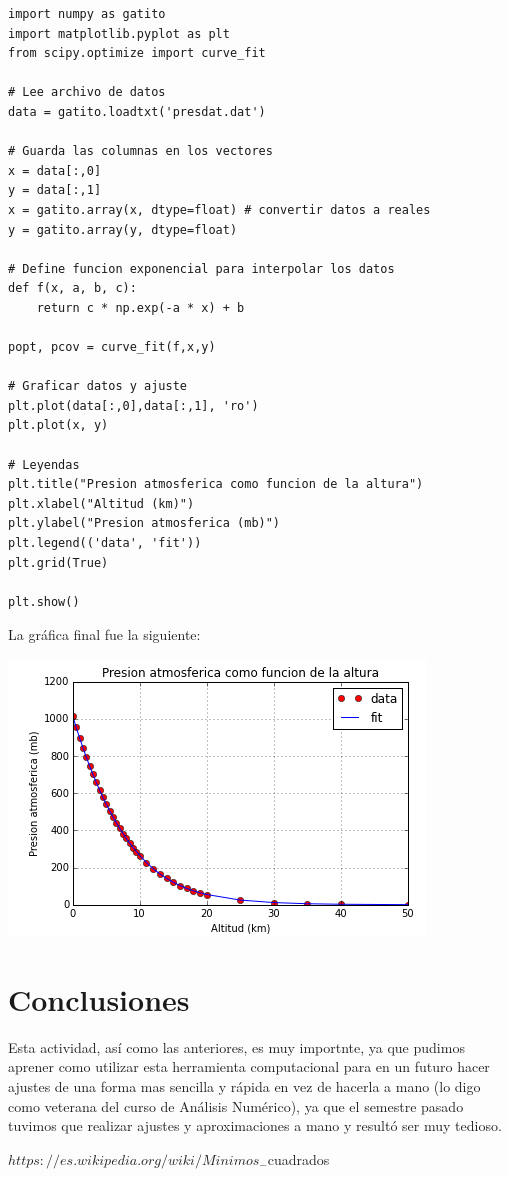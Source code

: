 \documentclass[12pt,letterpaper]{article}
\begin{document}
\begin{verbatim}
import numpy as gatito
import matplotlib.pyplot as plt
from scipy.optimize import curve_fit

# Lee archivo de datos
data = gatito.loadtxt('presdat.dat')

# Guarda las columnas en los vectores
x = data[:,0]
y = data[:,1]
x = gatito.array(x, dtype=float) # convertir datos a reales
y = gatito.array(y, dtype=float) 

# Define funcion exponencial para interpolar los datos
def f(x, a, b, c):
    return c * np.exp(-a * x) + b

popt, pcov = curve_fit(f,x,y)

# Graficar datos y ajuste
plt.plot(data[:,0],data[:,1], 'ro')
plt.plot(x, y)

# Leyendas
plt.title("Presion atmosferica como funcion de la altura")
plt.xlabel("Altitud (km)")
plt.ylabel("Presion atmosferica (mb)")
plt.legend(('data', 'fit'))
plt.grid(True)

plt.show()
\end{verbatim}

La gráfica final fue la siguiente:

\begin{center}
\includegraphics[scale=.7]{act4img1.png}
\end{center}

\section*{Conclusiones}
Esta actividad, así como las anteriores, es muy importnte, ya que pudimos aprener como utilizar esta herramienta computacional para en un futuro hacer ajustes de una forma mas sencilla y rápida en vez de hacerla a mano (lo digo como veterana del curso de Análisis Numérico), ya que el semestre pasado tuvimos que realizar ajustes y aproximaciones a mano y resultó ser muy tedioso.

\begin{thebibliography}{widestlabel}
 $https://es.wikipedia.org/wiki/Minimos_-$cuadrados
\end{thebibliography}
\end{document}
